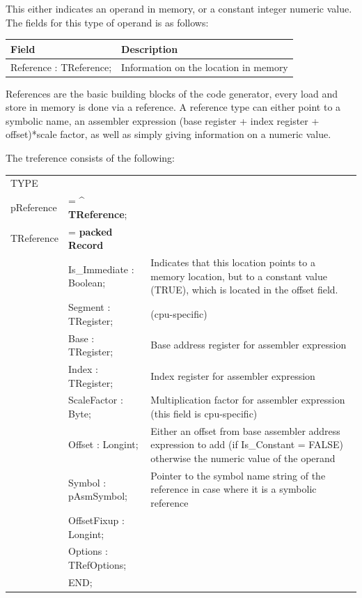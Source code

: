 \documentclass [a4paper,12pt]{article}
\begin{document}
This either indicates an operand in memory, or a constant integer numeric
value. The fields for this type of operand is as follows:

\begin{longtable}{|l|p{10cm}|}
\hline
Field   & Description \\
\hline
\endhead
\hline
\endfoot
\textsf{Reference : TReference;}&
    Information on the location in memory
\end{longtable}

References are the basic building blocks of the code generator, every load
and store in memory is done via a reference. A reference type can either
point to a symbolic name, an assembler expression (base register + index
register + offset)*scale factor, as well as simply giving information on a
numeric value.

The treference consists of the following:

\begin{tabular*}{6.5in}{|l@{\extracolsep{\fill}}lp{}|}
\hline
\textsf{TYPE} & & \\
\xspace \textsf{pReference} &= \^{} \textbf{TReference};&  \\
\xspace \textsf{TReference} &= \textbf{packed Record} & \\
&\textsf{Is{\_}Immediate : Boolean;}&
    Indicates that this location points to a memory location, but to a
    constant value (TRUE), which is located in the offset field. \\
&\textsf{Segment : TRegister;}& (cpu-specific) \\
&\textsf{Base : TRegister;}&
    Base address register for assembler expression \\
&\textsf{Index : TRegister;}&
    Index register for assembler expression \\
&\textsf{ScaleFactor : Byte;}&
    Multiplication factor for assembler expression (this field is
    cpu-specific) \\
&\textsf{Offset : Longint;}&
    Either an offset from base assembler address expression to add (if
    Is{\_}Constant = FALSE) otherwise the numeric value of the operand \\
&\textsf{Symbol : pAsmSymbol;}&
    Pointer to the symbol name string of the reference in case where it is
    a symbolic reference \\
&\textsf{OffsetFixup : Longint;}&  \\
&\textsf{Options : TRefOptions;}&  \\
&\textsf{END;}&  \\
\hline
\end{tabular*}
\end{document}
